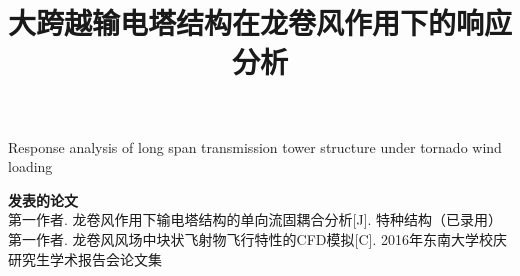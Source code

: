 \documentclass[masters,nocolorlinks]{seuthesix}
\begin{document}
\studentid{}   %
\title{大跨越输电塔结构在龙卷风作用下的响应分析}{}{Response analysis of long span transmission tower structure under tornado wind loading}{}
\author{}{}
\authorizedate{}
\committeechair{}
\reviewer{}{}

\makebigcover
\makecover



\tableofcontents

\mainmatter








% 

\appendix

% 






\begin{flushleft}
{\bfseries \large 发表的论文}\\ \relax
[1] 第一作者. 龙卷风作用下输电塔结构的单向流固耦合分析[J]. 特种结构（已录用）
\\ \relax
[2] 第一作者. 龙卷风风场中块状飞射物飞行特性的CFD模拟[C]. 2016年东南大学校庆研究生学术报告会论文集
\\
 
\end{flushleft}
\end{document}
